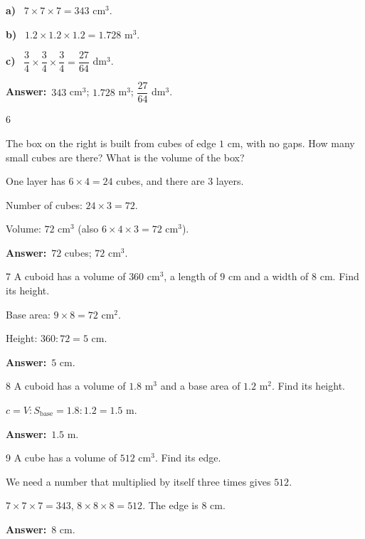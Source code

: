 \documentclass[11pt]{article}
\newif\ifsol \solfalse
\providecommand{\AnsWord}{Đáp số}
\newcommand{\dapso}[1]{\par\textbf{\AnsWord:}\ #1}
\newcommand{\probsol}[1]{%
  \begin{lrbox}{\solmeasure}\begin{minipage}{\dimexpr\linewidth-24pt\relax}#1\end{minipage}\end{lrbox}%
  \ifsol
    \begin{solbox}#1\end{solbox}%
  \else
    \setlength{\solht}{\dimexpr\ht\solmeasure+\dp\solmeasure+0.85cm\relax}%
    \ifdim\solht<1.35cm\setlength{\solht}{1.35cm}\fi
    \begin{tcolorbox}[colback=white,colframe=Line,boxrule=0.8pt,arc=5pt,
      left=8pt,right=8pt,top=4pt,bottom=4pt,height=\solht]{\footnotesize\color{Slate}\itshape\WorkWord}\end{tcolorbox}%
  \fi}
\newcommand{\pa}[1]{\textbf{#1)}\ }
\newcommand{\gap}{\vspace{0.3cm}}
\def\WorkWord{Your work:}
\def\AnsWord{Answer}
\begin{document}
\probsol{
\pa{a} $7\times7\times7=343$ cm$^3$.\par
\pa{b} $1.2\times1.2\times1.2=1.728$ m$^3$.\par
\pa{c} $\dfrac34\times\dfrac34\times\dfrac34=\dfrac{27}{64}$ dm$^3$.
\dapso{$343$ cm$^3$; $1.728$ m$^3$; $\dfrac{27}{64}$ dm$^3$.}}
\gap
\begin{probbox}{6}{\relax}
\begin{minipage}[t]{0.58\linewidth}
The box on the right is built from cubes of edge $1$ cm, with no gaps. How many small cubes are there? What is the volume of the box?
\end{minipage}\hfill
\begin{minipage}[t]{0.38\linewidth}\vspace{0pt}\centering
{}
\end{minipage}
\end{probbox}
\probsol{
One layer has $6\times4=24$ cubes, and there are $3$ layers.\par
Number of cubes: $24\times3=72$.\par
Volume: $72$ cm$^3$ (also $6\times4\times3=72$ cm$^3$).
\dapso{$72$ cubes; $72$ cm$^3$.}}
\gap
\begin{probbox}{7}{\relax}
A cuboid has a volume of $360$ cm$^3$, a length of $9$ cm and a width of $8$ cm. Find its height.
\end{probbox}
\probsol{
Base area: $9\times8=72$ cm$^2$.\par
Height: $360:72=5$ cm.
\dapso{$5$ cm.}}
\gap
\begin{probbox}{8}{\relax}
A cuboid has a volume of $1.8$ m$^3$ and a base area of $1.2$ m$^2$. Find its height.
\end{probbox}
\probsol{
$c=V:S_{\text{base}}=1.8:1.2=1.5$ m.
\dapso{$1.5$ m.}}
\gap
\begin{probbox}{9}{\relax}
A cube has a volume of $512$ cm$^3$. Find its edge.
\end{probbox}
\probsol{
We need a number that multiplied by itself three times gives $512$.\par
$7\times7\times7=343$, $8\times8\times8=512$. The edge is $8$ cm.
\dapso{$8$ cm.}}
\end{document}
